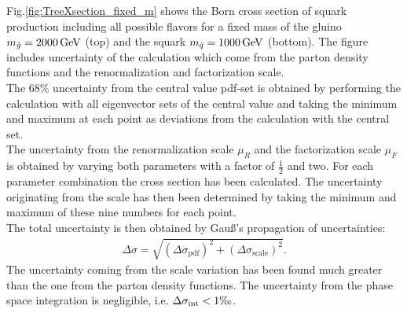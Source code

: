 Fig.\ref{fig:TreeXsection_fixed_m} shows the Born cross section of squark production including all possible flavors for a fixed mass of the gluino $m_{\tilde{g}} = \unit[2000]{GeV}$ (top) and the squark $m_{\tilde{q}} = \unit[1000]{GeV}$ (bottom). The figure includes uncertainty of the calculation which come from the parton density functions and the renormalization and factorization scale.\\
The 68\% uncertainty from the central value pdf-set is obtained by performing the calculation with all eigenvector sets of the central value and taking the minimum and maximum at each point as deviations from the calculation with the central set.\\
The uncertainty from the renormalization scale $\mu_R$ and the factorization scale $\mu_F$ is obtained by varying both parameters with a factor of $\frac{1}{2}$ and two. For each parameter combination the cross section has been calculated. The uncertainty originating from the scale has then been determined by taking the minimum and maximum of these nine numbers for each point.\\
The total uncertainty is then obtained by Gauß's propagation of uncertainties:
\begin{align}
\Delta \sigma = \sqrt{(\Delta \sigma_{\mathrm{pdf}})^2 + (\Delta \sigma_{\mathrm{scale}})^2}.
\end{align}
The uncertainty coming from the scale variation has been found much greater than the one from the parton density functions. The uncertainty from the phase space integration is negligible, i.e. $\Delta \sigma_{\mathrm{int}} < 1\text{\textperthousand}$.
\newpage

